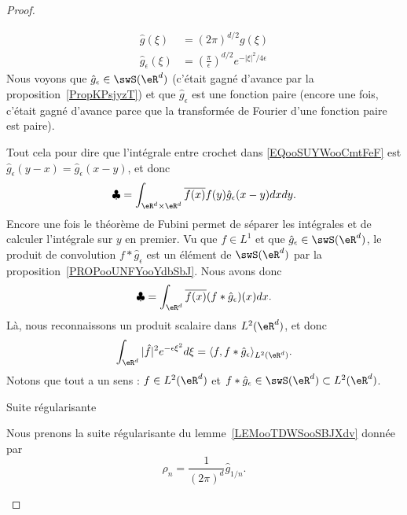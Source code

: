 \begin{proof}
\begin{subproof}
		\begin{subequations}
			\begin{align}
				\hat g(\xi)            & =(2\pi)^{d/2}g(\xi)                                                     \\
				\hat g_{\epsilon}(\xi) & =\left( \frac{ \pi }{ \epsilon } \right)^{d/2} e^{-| \xi |^2/4\epsilon}
			\end{align}
		\end{subequations}
		Nous voyons que \( \hat g_{\epsilon}\in\swS(\eR^d)\) (c'était gagné d'avance par la proposition~\ref{PropKPsjyzT}) et que \( \hat g_{\epsilon}\) est une fonction paire (encore une fois, c'était gagné d'avance parce que la transformée de Fourier d'une fonction paire est paire).

		Tout cela pour dire que l'intégrale entre crochet dans \eqref{EQooSUYWooCmtFeF} est \( \hat g_{\epsilon}(y-x)=\hat g_{\epsilon}(x-y)\), et donc
		\begin{equation}
			\clubsuit=\int_{\eR^d\times \eR^d} \overline{ f(x) }f(y)  \hat g_{\epsilon}(x-y)  dxdy.
		\end{equation}
		Encore une fois le théorème de Fubini permet de séparer les intégrales et de calculer l'intégrale sur \( y\) en premier. Vu que \( f\in L^1\) et que \( \hat g_{\epsilon}\in \swS(\eR^d)\), le produit de convolution \( f*\hat g_{\epsilon}\) est un élément de \( \swS(\eR^d)\) par la proposition~\ref{PROPooUNFYooYdbSbJ}.
		Nous avons donc
		\begin{equation}
			\clubsuit=\int_{\eR^d}\overline{ f(x) }(f* \hat g_{\epsilon})(x)dx.
		\end{equation}
		Là, nous reconnaissons un produit scalaire dans \( L^2(\eR^d)\), et donc
		\begin{equation}        \label{EQooWIHNooHutHlS}
			\int_{\eR^d}| \hat f |^2 e^{-\epsilon\xi^2}d\xi=\langle f, f*\hat g_{\epsilon}\rangle_{L^2(\eR^d)}.
		\end{equation}
		Notons que tout a un sens : \( f\in L^2(\eR^d)\) et \( f*\hat g_{\epsilon}\in\swS(\eR^d)\subset L^2(\eR^d)\).

		\item[Suite régularisante]

		Nous prenons la suite régularisante du lemme~\ref{LEMooTDWSooSBJXdv} donnée par
		\begin{equation}
			\rho_n=\frac{1}{ (2\pi)^d }\hat g_{1/n}.
		\end{equation}


\end{subproof}
\end{proof}
